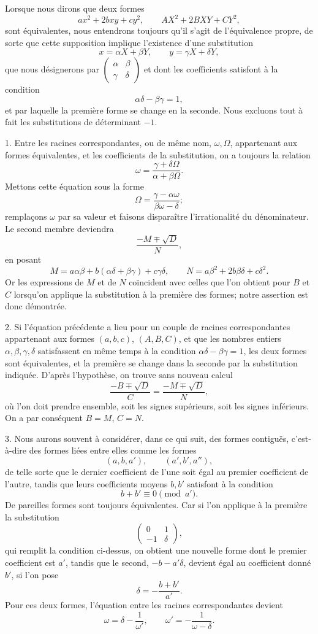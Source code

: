 \documentclass[11pt]{article}
\begin{document}
Lorsque nous dirons que deux formes
\[
 ax^2+2bxy+cy^2,\qquad AX^2+2BXY+CY^2,
\]
sont équivalentes, nous entendrons toujours qu'il s'agit de l'équivalence propre, de sorte que cette supposition implique l'existence d'une substitution
\[
 x=\alpha X+\beta Y,\qquad y=\gamma X+\delta Y,
\]
que nous désignerons par $\begin{pmatrix}\alpha&\beta\\ \gamma&\delta\end{pmatrix}$ et dont les coefficients satisfont à la condition
\[
  \alpha\delta-\beta\gamma=1,
\]
et par laquelle la première forme se change en la seconde. Nous excluons tout à fait les substitutions de déterminant $-1$.

1. Entre les racines correspondantes, ou de même nom, $\omega,\Omega$, appartenant aux formes équivalentes, et les coefficients de la substitution, on a toujours la relation
\[
  \omega=\frac{\gamma+\delta\Omega}{\alpha+\beta\Omega}.
\]
Mettons cette équation sous la forme
\[
  \Omega=\frac{\gamma-\alpha\omega}{\beta\omega-\delta};
\]
remplaçons $\omega$ par sa valeur et faisons disparaître l'irrationalité du dénominateur. Le second membre deviendra
\[
  \frac{-M\mp\sqrt D}{N},
\]
en posant
\[
 M=a\alpha\beta+b(\alpha\delta+\beta\gamma)+c\gamma\delta,
 \qquad
 N=a\beta^2+2b\beta\delta+c\delta^2.
\]
Or les expressions de $M$ et de $N$ coïncident avec celles que l'on obtient pour $B$ et $C$ lorsqu'on applique la substitution à la première des formes; notre assertion est donc démontrée.

2. Si l'équation précédente a lieu pour un couple de racines correspondantes appartenant aux formes $(a,b,c)$, $(A,B,C)$, et que les nombres entiers $\alpha,\beta,\gamma,\delta$ satisfassent en même temps à la condition $\alpha\delta-\beta\gamma=1$, les deux formes sont équivalentes, et la première se change dans la seconde par la substitution indiquée. D'après l'hypothèse, on trouve sans nouveau calcul
\[
  \frac{-B\mp\sqrt D}{C}=\frac{-M\mp\sqrt D}{N},
\]
où l'on doit prendre ensemble, soit les signes supérieurs, soit les signes inférieurs. On a par conséquent $B=M$, $C=N$.

3. Nous aurons souvent à considérer, dans ce qui suit, des formes contiguës, c'est-à-dire des formes liées entre elles comme les formes
\[
  (a,b,a'),\qquad (a',b',a''),
\]
de telle sorte que le dernier coefficient de l'une soit égal au premier coefficient de l'autre, tandis que leurs coefficients moyens $b,b'$ satisfont à la condition
\[
  b+b'\equiv0\pmod {a'}.
\]
De pareilles formes sont toujours équivalentes. Car si l'on applique à la première la substitution
\[
  \begin{pmatrix}0&1\\-1&\delta\end{pmatrix},
\]
qui remplit la condition ci-dessus, on obtient une nouvelle forme dont le premier coefficient est $a'$, tandis que le second, $-b-a'\delta$, devient égal au coefficient donné $b'$, si l'on pose
\[
  \delta=-\frac{b+b'}{a'}.
\]
Pour ces deux formes, l'équation entre les racines correspondantes devient
\[
  \omega=\delta-\frac1{\omega'},\qquad
  \omega'=-\frac1{\omega-\delta}.
\]
\end{document}
